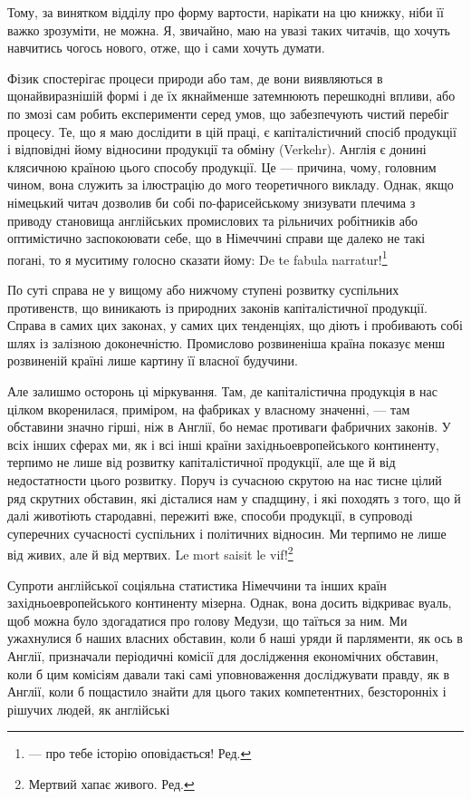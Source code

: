 Тому, за винятком відділу про форму вартости, нарікати на цю
книжку, ніби її важко зрозуміти, не можна. Я, звичайно, маю
на увазі таких читачів, що хочуть навчитись чогось нового, отже,
що і сами хочуть думати.

Фізик спостерігає процеси природи або там, де вони виявляються
в щонайвиразнішій формі і де їх якнайменше затемнюють
перешкодні впливи, або по змозі сам робить експерименти серед
умов, що забезпечують чистий перебіг процесу. Те, що я маю
дослідити в цій праці, є капіталістичний спосіб продукції і відповідні
йому відносини продукції та обміну (Verkehr). Англія
є донині клясичною країною цього способу продукції. Це —
причина, чому, головним чином, вона служить за ілюстрацію
до мого теоретичного викладу. Однак, якщо німецький читач
дозволив би собі по-фарисейському знизувати плечима з приводу
становища англійських промислових та рільничих робітників або
оптимістично заспокоювати себе, що в Німеччині справи ще далеко
не такі погані, то я муситиму голосно сказати йому: De
te fabula narratur!\footnote*{
— про тебе історію оповідається! Ред.
}

По суті справа не у вищому або нижчому ступені розвитку
суспільних противенств, що виникають із природних законів капіталістичної
продукції. Справа в самих цих законах, у самих цих
тенденціях, що діють і пробивають собі шлях із залізною доконечністю.
Промислово розвиненіша країна показує менш розвиненій
країні лише картину її власної будучини.

Але залишмо осторонь ці міркування. Там, де капіталістична
продукція в нас цілком вкоренилася, приміром, на фабриках
у власному значенні, — там обставини значно гірші, ніж в Англії,
бо немає противаги фабричних законів. У всіх інших сферах ми,
як і всі інші країни західньоевропейського континенту, терпимо
не лише від розвитку капіталістичної продукції, але ще й від
недостатности цього розвитку. Поруч із сучасною скрутою на
нас тисне цілий ряд скрутних обставин, які дісталися нам у
спадщину, і які походять з того, що й далі животіють стародавні,
пережиті вже, способи продукції, в супроводі суперечних
сучасності суспільних і політичних відносин. Ми терпимо
не лише від живих, але й від мертвих. Le mort saisit le vif!\footnote*{
Мертвий хапає живого. Ред.
}

Супроти англійської соціяльна статистика Німеччини та інших
країн західньоевропейського континенту мізерна. Однак, вона
досить відкриває вуаль, щоб можна було здогадатися про голову
Медузи, що таїться за ним. Ми ужахнулися б наших власних
обставин, коли б наші уряди й парляменти, як ось в Англії, призначали
періодичні комісії для дослідження економічних обставин,
коли б цим комісіям давали такі самі уповноваження досліджувати
правду, як в Англії, коли б пощастило знайти для цього
таких компетентних, безсторонніх і рішучих людей, як англійські